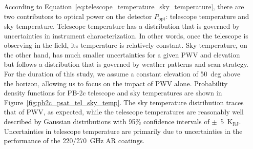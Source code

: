 According to Equation~\ref{eq:telescope_temperature_sky_temperature}, there are two contributors to optical power on the detector $P_{\mathrm{opt}}$: telescope temperature and sky temperature. Telescope temperature has a distribution that is governed by uncertainties in instrument characterization. In other words, once the telescope is observing in the field, its temperature is relatively constant. Sky temperature, on the other hand, has much smaller uncertainties for a given PWV and elevation but follows a distribution that is governed by weather patterns and scan strategy. For the duration of this study, we assume a constant elevation of 50~deg above the horizon, allowing us to focus on the impact of PWV alone. Probability density functions for PB-2c telescope and sky temperatures are shown in Figure~\ref{fig:pb2c_psat_tel_sky_temp}. The sky temperature distribution traces that of PWV, as expected, while the telescope temperatures are reasonably well described by Gaussian distributions with 95\% confidence intervals of $\pm$~5~$\mathrm{K_{RJ}}$. Uncertainties in telescope temperature are primarily due to uncertainties in the performance of the 220/270~GHz AR coatings.


